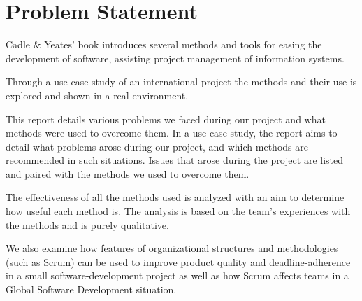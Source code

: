 \section{Problem Statement}
\label{sec:problemstatement}
Cadle \& Yeates' book \cite{caye} introduces several methods and tools for easing the
development of software, assisting project management of information systems.

Through a use-case study of an international project the methods and their use
is explored and shown in a real environment.

This report details various problems we faced during our project and what
methods were used to overcome them. In a use case study, the report aims to
detail what problems arose during our project, and which methods are
recommended in such situations.  Issues that arose during the project are
listed and paired with the methods we used to overcome them.

The effectiveness of all the methods used is analyzed with an aim to determine
how useful each method is. The analysis is based on the team’s experiences with
the methods and is purely qualitative.

We also examine how features of organizational structures and methodologies
(such as Scrum) can be used to improve product quality and deadline-adherence
in a small software-development project as well as how Scrum affects teams in
a Global Software Development situation.
